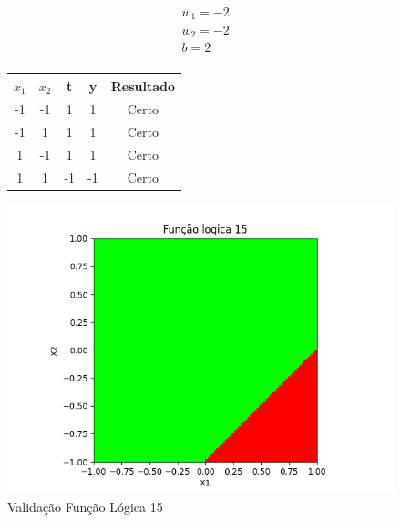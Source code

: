 \begin{figure}[h!]
\centering
\begin{minipage}[c]{0.49\linewidth}
\centering
\[
\begin{aligned}
&w_1 = -2\\
&w_2 = -2\\
&b = 2\\
\end{aligned}
\]
\begin{tabular}{|c|c|c|c|c|}\hline
$x_1$ & $x_2$ & t & y & Resultado\\ \hline
 -1 & -1 & 1 & 1 & Certo\\ \hline
 -1 & 1 & 1 & 1 & Certo\\ \hline
 1 & -1 & 1 & 1 & Certo\\ \hline
 1 & 1 & -1 & -1 & Certo\\ \hline
\end{tabular}
\end{minipage}
\hfill
\begin{minipage}[c]{0.5\linewidth}
\centering
\singlespacing
\includegraphics[width=1.2\textwidth]{im/im15}
\end{minipage}
\caption{Validação Função Lógica 15}
\label{vl15}
\end{figure}

